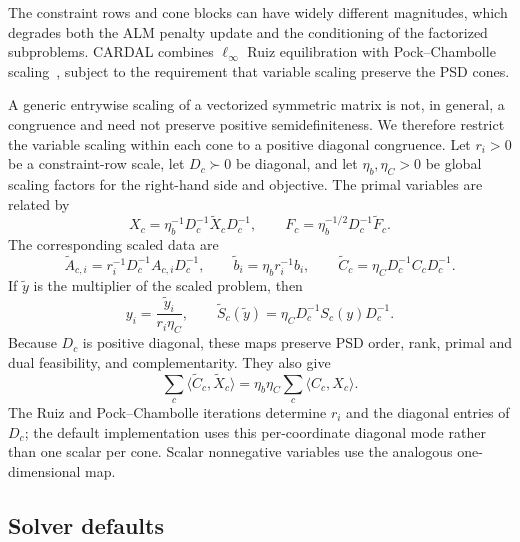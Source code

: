\documentclass[11pt]{article}
\theoremstyle{definition}
\theoremstyle{remark}
\newcommand{\name}{\textsc{CARDAL}\xspace}
\begin{document}
The constraint rows and cone blocks can have widely different magnitudes,
which degrades both the ALM penalty update and the conditioning of the
factorized subproblems.  \name{} combines $\ell_\infty$ Ruiz equilibration
with Pock--Chambolle scaling~\cite{PockChambolle2011}, subject to the
requirement that variable scaling preserve the PSD cones.

A generic entrywise scaling of a vectorized symmetric matrix is not, in
general, a congruence and need not preserve positive semidefiniteness.  We
therefore restrict the variable scaling within each cone to a positive
diagonal congruence.  Let $r_i>0$ be a constraint-row scale, let
$D_c\succ0$ be diagonal, and let $\eta_b,\eta_C>0$ be global scaling factors
for the right-hand side and objective.  The primal variables are related by
\begin{equation}
  X_c=\eta_b^{-1}D_c^{-1}\widetilde X_cD_c^{-1},
  \qquad
  F_c=\eta_b^{-1/2}D_c^{-1}\widetilde F_c.
  \label{eq:cone-scaling-map}
\end{equation}
The corresponding scaled data are
\begin{equation}
  \widetilde A_{c,i}
    =r_i^{-1}D_c^{-1}A_{c,i}D_c^{-1},
  \qquad
  \widetilde b_i=\eta_b r_i^{-1}b_i,
  \qquad
  \widetilde C_c=\eta_C D_c^{-1}C_cD_c^{-1}.
  \label{eq:scaled-sdp-data}
\end{equation}
If $\widetilde y$ is the multiplier of the scaled problem, then
\begin{equation}
  y_i=\frac{\widetilde y_i}{r_i\eta_C},
  \qquad
  \widetilde S_c(\widetilde y)
  =\eta_CD_c^{-1}S_c(y)D_c^{-1}.
  \label{eq:scaled-dual-map}
\end{equation}
Because $D_c$ is positive diagonal, these maps preserve PSD order, rank,
primal and dual feasibility, and complementarity.  They also give
\[
  \sum_c\langle\widetilde C_c,\widetilde X_c\rangle
  =\eta_b\eta_C\sum_c\langle C_c,X_c\rangle.
\]
The Ruiz and Pock--Chambolle iterations determine $r_i$ and the diagonal
entries of $D_c$; the default implementation uses this per-coordinate
diagonal mode rather than one scalar per cone.  Scalar nonnegative variables
use the analogous one-dimensional map.

\subsection{Solver defaults}
\label{subsec:defaults}
\end{document}
